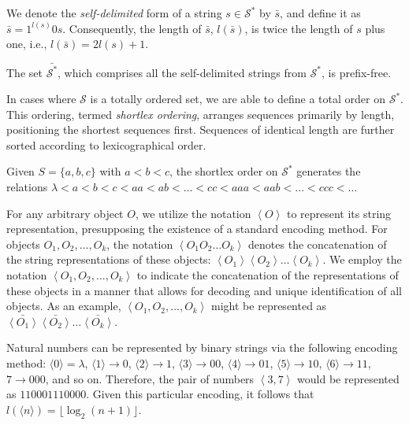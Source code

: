 We denote the \emph{self-delimited} form of a string $s \in \mathcal{S}^{\ast}$ by $\bar{s}$, and define it as $\bar{s} = 1^{l(s)}0s$. Consequently, the length of $\bar{s}$, $l(\bar{s})$, is twice the length of $s$ plus one, i.e., $l(\bar{s}) = 2l(s)+1$.

\begin{example}
The set $\bar{\mathcal{S}^{\ast}}$, which comprises all the self-delimited strings from $\mathcal{S}^{\ast}$, is prefix-free.
\end{example}

In cases where $\mathcal{S}$ is a totally ordered set, we are able to define a total order on $\mathcal{S}^{\ast}$. This ordering, termed \emph{shortlex ordering}, arranges sequences primarily by length, positioning the shortest sequences first. Sequences of identical length are further sorted according to lexicographical order.

\begin{example}
Given $S = \{a, b, c\}$ with $a < b < c$, the shortlex order on $\mathcal{S}^{\ast}$ generates the relations $\lambda < a < b < c < aa < ab < \ldots < cc < aaa < aab < \ldots < ccc < \ldots$
\end{example}

For any arbitrary object $O$, we utilize the notation $\left\langle O\right\rangle$ to represent its string representation, presupposing the existence of a standard encoding method. For objects $O_{1},O_{2},\ldots,O_{k}$, the notation $\left\langle O_1 O_2 \ldots O_k \right\rangle$ denotes the concatenation of the string representations of these objects: $\left\langle O_1 \right\rangle \left\langle O_2 \right\rangle \ldots \left\langle O_k \right\rangle$. We employ the notation $\left\langle O_1, O_2,\ldots,O_k \right\rangle$ to indicate the concatenation of the representations of these objects in a manner that allows for decoding and unique identification of all objects. As an example, $\left\langle O_1, O_2,\ldots,O_k \right\rangle$ might be represented as $\bar{\left\langle O_1 \right\rangle} \bar{\left\langle O_2 \right\rangle} \ldots \bar{\left\langle O_k \right\rangle}$.

\begin{example}
Natural numbers can be represented by binary strings via the following encoding method: $\langle 0 \rangle = \lambda$, $\langle 1 \rangle \rightarrow 0$, $\langle 2 \rangle \rightarrow 1$, $\langle 3 \rangle \rightarrow 00$, $\langle 4 \rangle \rightarrow 01$, $\langle 5 \rangle \rightarrow 10$, $\langle 6 \rangle \rightarrow 11$, $7 \rightarrow 000$, and so on. Therefore, the pair of numbers $\left\langle 3, 7 \right\rangle$ would be represented as $110001110000$. Given this particular encoding, it follows that $l \left( \langle n \rangle \right) = \lfloor \log_2 (n + 1) \rfloor$.
\end{example}

